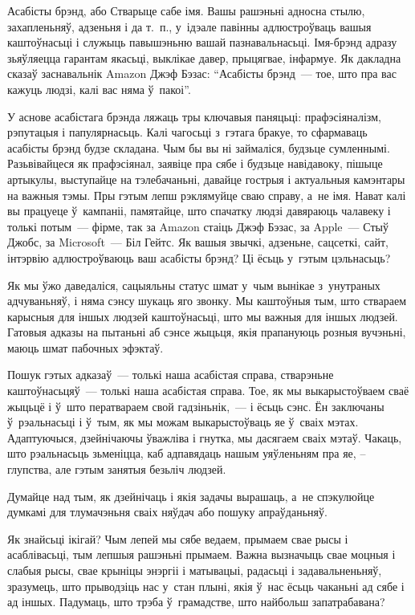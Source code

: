 Асабісты брэнд, або Стварыце сабе імя. Вашы рашэньні адносна стылю, захапленьняў, адзеньня і да т.~п., у~ідэале павінны адлюстроўваць вашыя каштоўнасьці і служыць павышэньню вашай пазнавальнасьці. Імя-брэнд адразу зьяўляецца гарантам якасьці, выклікае давер, прыцягвае, інфармуе. Як дакладна сказаў заснавальнік Amazon Джэф Бэзас: ``Асабісты брэнд~--- тое, што пра вас кажуць людзі, калі вас няма ў~пакоі''.

У аснове асабістага брэнда ляжаць тры ключавыя паняцьці: прафэсіяналізм, рэпутацыя і папулярнасьць. Калі чагосьці з~гэтага бракуе, то сфармаваць асабісты брэнд будзе складана. Чым бы вы ні займаліся, будзьце сумленнымі. Разьвівайцеся як прафэсіянал, заявіце пра сябе і будзьце навідавоку, пішыце артыкулы, выступайце на тэлебачаньні, давайце гострыя і актуальныя камэнтары на важныя тэмы. Пры гэтым лепш рэклямуйце сваю справу, а~не імя. Нават калі вы працуеце ў~кампаніі, памятайце, што спачатку людзі давяраюць чалавеку і толькі потым~--- фірме, так за Amazon стаіць Джэф Бэзас, за Apple~--- Стыў Джобс, за Microsoft~--- Біл Гейтс. Як вашыя звычкі, адзеньне, сацсеткі, сайт, інтэрвію адлюстроўваюць ваш асабісты брэнд? Ці ёсьць у~гэтым цэльнасьць?

Як мы ўжо даведаліся, сацыяльны статус шмат у~чым вынікае з~унутраных адчуваньняў, і няма сэнсу шукаць яго звонку. Мы каштоўныя тым, што ствараем карысныя для іншых людзей каштоўнасьці, што мы важныя для іншых людзей. Гатовыя адказы на пытаньні аб сэнсе жыцьця, якія прапануюць розныя вучэньні, маюць шмат пабочных эфэктаў.

Пошук гэтых адказаў~--- толькі наша асабістая справа, стварэньне каштоўнасьцяў~--- толькі наша асабістая справа. Тое, як мы выкарыстоўваем сваё жыцьцё і ў~што ператвараем свой гадзіньнік,~--- і ёсьць сэнс. Ён заключаны ў~рэальнасьці і ў~тым, як мы можам выкарыстоўваць яе ў~сваіх мэтах. Адаптуючыся, дзейнічаючы ўважліва і гнутка, мы дасягаем сваіх мэтаў. Чакаць, што рэальнасьць зьменіцца, каб адпавядаць нашым уяўленьням пра яе, -- глупства, але гэтым занятыя безьліч людзей. 

Думайце над тым, як дзейнічаць і якія задачы вырашаць, а~не спэкулюйце думкамі для тлумачэньня сваіх няўдач або пошуку апраўданьняў.

Як знайсьці ікігай? Чым лепей мы сябе ведаем, прымаем свае рысы і асаблівасьці, тым лепшыя рашэньні прымаем. Важна вызначыць свае моцныя і слабыя рысы, свае крыніцы энэргіі і матывацыі, радасьці і задавальненьняў, зразумець, што прыводзіць нас у~стан плыні, якія ў~нас ёсьць чаканьні ад сябе і ад іншых. Падумаць, што трэба ў~грамадстве, што найбольш запатрабавана? 

